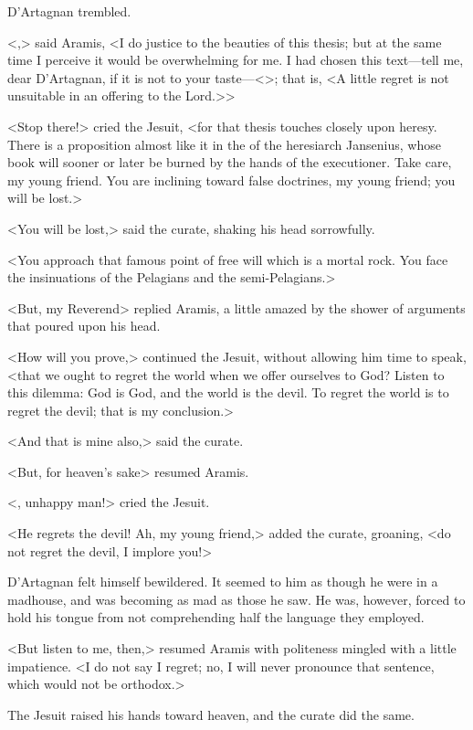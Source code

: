 D'Artagnan trembled. 

<,> said Aramis, <I do justice to the beauties of this thesis; but at the same time I perceive it would be overwhelming for me. I had chosen this text—tell me, dear D'Artagnan, if it is not to your taste—<>; that is, <A little regret is not unsuitable in an offering to the Lord.>> 

<Stop there!> cried the Jesuit, <for that thesis touches closely upon heresy. There is a proposition almost like it in the  of the heresiarch Jansenius, whose book will sooner or later be burned by the hands of the executioner. Take care, my young friend. You are inclining toward false doctrines, my young friend; you will be lost.> 

<You will be lost,> said the curate, shaking his head sorrowfully. 

<You approach that famous point of free will which is a mortal rock. You face the insinuations of the Pelagians and the semi-Pelagians.> 

<But, my Reverend\longdash> replied Aramis, a little amazed by the shower of arguments that poured upon his head. 

<How will you prove,> continued the Jesuit, without allowing him time to speak, <that we ought to regret the world when we offer ourselves to God? Listen to this dilemma: God is God, and the world is the devil. To regret the world is to regret the devil; that is my conclusion.> 

<And that is mine also,> said the curate. 

<But, for heaven's sake\longdash> resumed Aramis. 

<, unhappy man!> cried the Jesuit. 

<He regrets the devil! Ah, my young friend,> added the curate, groaning, <do not regret the devil, I implore you!> 

D'Artagnan felt himself bewildered. It seemed to him as though he were in a madhouse, and was becoming as mad as those he saw. He was, however, forced to hold his tongue from not comprehending half the language they employed. 

<But listen to me, then,> resumed Aramis with politeness mingled with a little impatience. <I do not say I regret; no, I will never pronounce that sentence, which would not be orthodox.> 

The Jesuit raised his hands toward heaven, and the curate did the same. 


